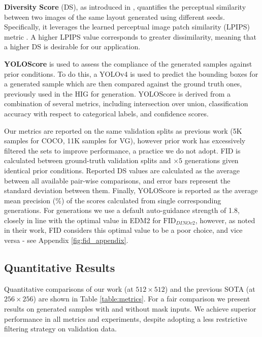 \textbf{Diversity Score} (DS), as introduced in \cite{zheng_layoutdiffusion_2024}, quantifies the perceptual similarity between two images of the same layout generated using different seeds. Specifically, it leverages the learned perceptual image patch similarity (LPIPS) metric \cite{zhang2018perceptual}. A higher LPIPS value corresponds to greater dissimilarity, meaning that a higher DS is desirable for our application.


\textbf{YOLOScore} \cite{LAMA} is used to assess the compliance of the generated samples against prior conditions. To do this, a YOLOv4 \cite{bochkovskiy2020yolov4optimalspeedaccuracy} is used to predict the bounding boxes for a generated sample which are then compared against the ground truth ones, previously used in the HIG for generation. YOLOScore is derived from a combination of several metrics,  including intersection over union, classification accuracy with respect to categorical labels, and confidence scores.

Our metrics are reported on the same validation splits as previous work (5K samples for COCO, 11K samples for VG), however prior work has excessively filtered the sets to improve performance, a practice we do not adopt. FID is calculated between ground-truth validation splits and $\times5$ generations given identical prior conditions. Reported DS values are calculated as the average between all available pair-wise comparisons, and error bars represent the standard deviation between them. Finally, YOLOScore is reported as the average mean precision (\%) of the scores calculated from single corresponding generations. For generations we use a default auto-guidance strength of 1.8, closely in line with the optimal value in EDM2 for $\text{FID}_{\textit{DINOv2}}$, however, as noted in their work, FID considers this optimal value to be a poor choice, and vice versa - see Appendix \ref{fig:fid_appendix}.

\subsection{Quantitative Results}

Quantitative comparisons of our work (at $512\times512$) and the previous SOTA (at $256\times256$) are shown in Table \ref{table:metrics}. For a fair comparison we present results on generated samples with and without mask inputs. We achieve superior performance in all metrics and experiments, despite adopting a less restrictive filtering strategy on validation data. 

